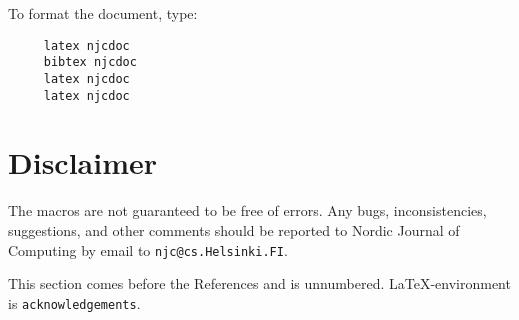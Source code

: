 To format the document, type:
\begin{verbatim}
     latex njcdoc 
     bibtex njcdoc
     latex njcdoc
     latex njcdoc
\end{verbatim}
 
\section{Disclaimer}
The macros are not guaranteed to be free of errors.
Any bugs, inconsistencies, suggestions, and other comments
should be reported to {\sc Nordic Journal of Computing} by
email to {\tt njc@cs.Helsinki.FI}.

\begin{acknowledgements}
This section comes before the References and is unnumbered.
\LaTeX-en\-viron\-ment is \verb|acknowledgements|.
\end{acknowledgements}






